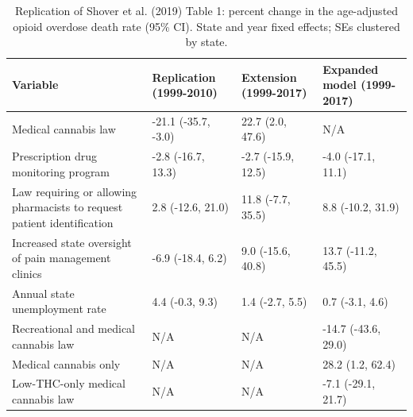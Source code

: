 \begin{table}

\caption{Replication of Shover et al. (2019) Table 1: percent change in the age-adjusted opioid overdose death rate (95\% CI). State and year fixed effects; SEs clustered by state.}
\centering
\begin{tabular}[t]{llll}
\toprule
Variable & Replication (1999-2010) & Extension (1999-2017) & Expanded model (1999-2017)\\
\midrule
Medical cannabis law & -21.1 (-35.7, -3.0) & 22.7 (2.0, 47.6) & N/A\\
Prescription drug monitoring program & -2.8 (-16.7, 13.3) & -2.7 (-15.9, 12.5) & -4.0 (-17.1, 11.1)\\
Law requiring or allowing pharmacists to request patient identification & 2.8 (-12.6, 21.0) & 11.8 (-7.7, 35.5) & 8.8 (-10.2, 31.9)\\
Increased state oversight of pain management clinics & -6.9 (-18.4, 6.2) & 9.0 (-15.6, 40.8) & 13.7 (-11.2, 45.5)\\
Annual state unemployment rate & 4.4 (-0.3, 9.3) & 1.4 (-2.7, 5.5) & 0.7 (-3.1, 4.6)\\
\addlinespace
Recreational and medical cannabis law & N/A & N/A & -14.7 (-43.6, 29.0)\\
Medical cannabis only & N/A & N/A & 28.2 (1.2, 62.4)\\
Low-THC-only medical cannabis law & N/A & N/A & -7.1 (-29.1, 21.7)\\
\bottomrule
\end{tabular}
\end{table}

